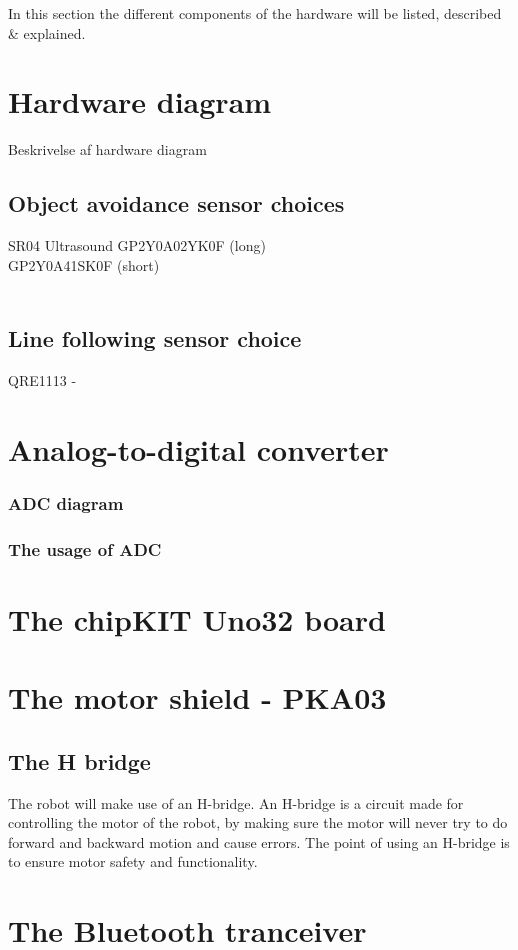 In this section the different components of the hardware will be listed, described & explained.

\section{Hardware diagram}
Beskrivelse af hardware diagram


\subsection{Object avoidance sensor choices}
SR04 Ultrasound
GP2Y0A02YK0F (long) \\	
GP2Y0A41SK0F (short) \\
\\
\subsection{Line following sensor choice} 

QRE1113 - 
\section{Analog-to-digital converter}


\subsubsection{ADC diagram} 

\subsubsection{The usage of ADC}

\section{The chipKIT Uno32 board}


\section{The motor shield - PKA03}

\subsection{The H bridge}
The robot will make use of an H-bridge. An H-bridge is a circuit made for controlling the motor of the robot, by making sure the motor will never try to do forward and backward motion  and cause errors. The point of using an H-bridge is to ensure motor safety and functionality.

\section{The Bluetooth tranceiver}

